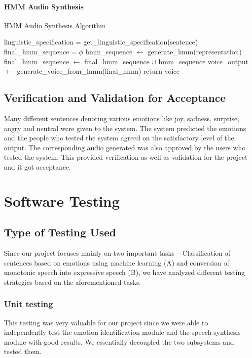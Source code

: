\documentclass[oneside,a4paper,12pt]{book}
\begin{document}
\subsubsection{HMM Audio Synthesis}
		 \begin{algorithm}
\caption{HMM Audio Synthesis Algorithm}
\label{HMMAudio}
\begin{algorithmic}[1]
\State linguistic\_specification = get\_linguistic\_specification(sentence)
\State final\_hmm\_sequence = $\phi$
\State hmm\_sequence $\leftarrow$ generate\_hmm(representation)
\State final\_hmm\_sequence $\leftarrow$ final\_hmm\_sequence $\cup$ hmm\_sequence
\EndFor
\State voice\_output $\leftarrow$ generate\_voice\_from\_hmm(final\_hmm)
\State return voice
\EndProcedure
\end{algorithmic}
\end{algorithm}
	  
  \section{Verification and Validation for Acceptance}
  Many different sentences denoting various emotions like joy, sadness, surprise, angry and neutral were given to the system. The system predicted the emotions and the people who tested the system agreed on the satisfactory level of the output. The corresponding audio generated was also approved by the users who tested the system. This provided verification as well as validation for the project and it got acceptance.
  
\chapter{Software Testing}
\section{Type of Testing Used}
Since our project focuses mainly on two important tasks – Classification of sentences based on emotions using machine learning (A) and conversion of monotonic speech into expressive speech (B), we have analyzed different testing strategies based on the aforementioned tasks.
\subsection{Unit testing}
This testing was very valuable for our project since we were able to independently test the emotion identification module and the speech synthesis module with good results. We essentially decoupled the two subsystems and tested them.
\end{document}
